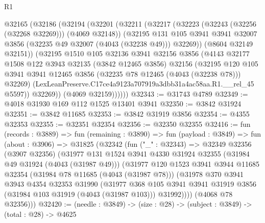 \begin{lexlean}{R1}
\begin{coremodule}
        @32165
          (@32186
            (@32194
              (@32201
                (@32211
                  (@32217
                    (@32223 (@32243 (@32256 (@32268 @32269))) (@4069 @32148))
                    (@32195
                      @131
                      @105
                      @3941
                      @3941
                      @32007
                      @3856
                      (@32235 @49 @32007 (@4043 (@32238 @49)))
                      @32269))
                  (@8604 @32149 @32151))
                (@32195
                  @1510
                  @105
                  @32136
                  @3941
                  @32156
                  @3856
                  (@4143
                    @32177
                    @1508
                    @122
                    @3943
                    @32135
                    (@3842 @12465 @3856)
                    @32156
                    (@32195
                      @120
                      @105
                      @3941
                      @3941
                      @12465
                      @3856
                      (@32235 @78 @12465 (@4043 (@32238 @78)))
                      @32269)
                    (LexLeanPreserve.C17ce4a9123a707919a3dbb31a4ac58aa.R1.__rel_45 @5597))
                  @32269))
              (@4069 @32159))))))
@32343 := @31743 @4789
@32349 := @4018 @31930 @169 @112 @1525 @13401 @3941
@32350 := @3842 @31924
@32351 := @3842 @11685
@32353 := @3842 @31919 @3856
@32354 := @4355 @32353
@32355 := @32351 @32354
@32356 := @32350 @32355
@32416 := fun (records : @3889) =>
  fun (remaining : @3890) =>
  fun (payload : @3849) =>
  fun (about : @3906) =>
  @31825
    (@32342
      (fun ("_" : @32343) =>
      @32349
        @32356
        (@3907 @32356)
        (@31977
          @131
          @1524
          @3941
          @4330
          @31924
          @32355
          (@31984 @49 @31924 (@4043 (@31987 @49)))
          (@31977
            @120
            @1523
            @3941
            @3944
            @11685
            @32354
            (@31984 @78 @11685 (@4043 (@31987 @78)))
            (@31978
              @370
              @3941
              @3943
              @4354
              @32353
              @31990
              (@31977
                @368
                @105
                @3941
                @3941
                @31919
                @3856
                (@31984 @103 @31919 (@4043 (@31987 @103)))
                @31992))))
        (@4068 @78 @32356)))
@32420 := (needle : @3849) -> (size : @28) -> (subject : @3849) -> (total : @28) -> @4625

\end{coremodule}
\end{lexlean}
